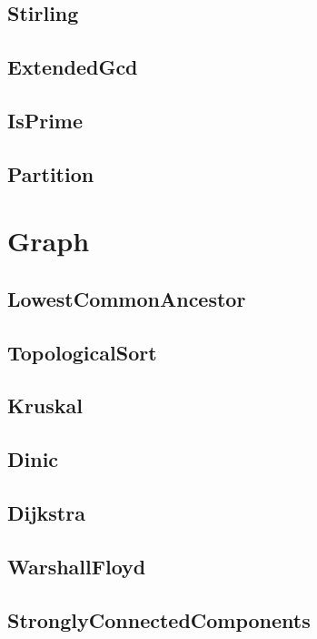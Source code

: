 \documentclass[titlepage, landscape, a4paper, twocolumn, 10pt]{ujarticle}
\begin{document}
\subsection{Stirling}


\subsection{ExtendedGcd}


\subsection{IsPrime}


\subsection{Partition}



\section{Graph}

\subsection{LowestCommonAncestor}


\subsection{TopologicalSort}


\subsection{Kruskal}


\subsection{Dinic}


\subsection{Dijkstra}


\subsection{WarshallFloyd}


\subsection{StronglyConnectedComponents}

\end{document}
